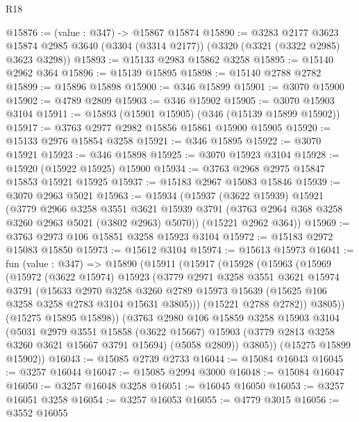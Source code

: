 \begin{lexlean}{R18}
\begin{coremodule}
@15876 := (value : @347) -> @15867 @15874
@15890 := @3283
    @2177
    @3623
    @15874
    @2985
    @3640
    (@3304 (@3314 @2177))
    (@3320 (@3321 (@3322 @2985) @3623 @3298))
@15893 := @15133 @2983 @15862 @3258
@15895 := @15140 @2962 @364
@15896 := @15139 @15895
@15898 := @15140 @2788 @2782
@15899 := @15896 @15898
@15900 := @346 @15899
@15901 := @3070 @15900
@15902 := @4789 @2809
@15903 := @346 @15902
@15905 := @3070 @15903 @3104
@15911 := @15893 (@15901 @15905) (@346 (@15139 @15899 @15902))
@15917 := @3763 @2977 @2982 @15856 @15861 @15900 @15905
@15920 := @15133 @2976 @15854 @3258
@15921 := @346 @15895
@15922 := @3070 @15921
@15923 := @346 @15898
@15925 := @3070 @15923 @3104
@15928 := @15920 (@15922 @15925) @15900
@15934 := @3763 @2968 @2975 @15847 @15853 @15921 @15925
@15937 := @15183 @2967 @15083 @15846
@15939 := @3070 @2963 @5021
@15963 := @15934
    (@15937
      (@3622 @15939)
      @15921
      (@3779
        @2966
        @3258
        @3551
        @3621
        @15939
        @3791
        (@3763 @2964 @368 @3258 @3260 @2963 @5021 (@3802 @2963) @5070))
      (@15221 @2962 @364))
@15969 := @3763 @2973 @106 @15851 @3258 @15923 @3104
@15972 := @15183 @2972 @15083 @15850
@15973 := @15612 @3104
@15974 := @15613 @15973
@16041 := fun (value : @347) =>
  @15890
    (@15911
      (@15917
        (@15928
          (@15963
            (@15969
              (@15972
                (@3622 @15974)
                @15923
                (@3779
                  @2971
                  @3258
                  @3551
                  @3621
                  @15974
                  @3791
                  (@15633
                    @2970
                    @3258
                    @3260
                    @2789
                    @15973
                    @15639
                    (@15625 @106 @3258 @3258 @2783 @3104 @15631 @3805)))
                (@15221 @2788 @2782))
              @3805))
          (@15275 @15895 @15898))
        (@3763
          @2980
          @106
          @15859
          @3258
          @15903
          @3104
          (@5031
            @2979
            @3551
            @15858
            (@3622 @15667)
            @15903
            (@3779 @2813 @3258 @3260 @3621 @15667 @3791 @15694)
            (@5058 @2809))
          @3805))
      (@15275 @15899 @15902))
@16043 := @15085 @2739 @2733
@16044 := @15084 @16043
@16045 := @3257 @16044
@16047 := @15085 @2994 @3000
@16048 := @15084 @16047
@16050 := @3257 @16048 @3258
@16051 := @16045 @16050
@16053 := @3257 @16051 @3258
@16054 := @3257 @16053
@16055 := @4779 @3015
@16056 := @3552 @16055

\end{coremodule}
\end{lexlean}
